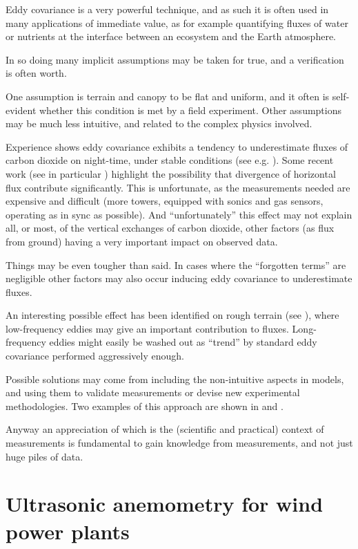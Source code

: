 \documentclass[a4paper,10pt]{book}
\begin{document}
Eddy covariance is a very powerful technique, and as such it is often used in many applications of immediate value, as for example quantifying fluxes of water or nutrients at the interface between an ecosystem and the Earth atmosphere.

In so doing many implicit assumptions may be taken for true, and a verification is often worth.

One assumption is terrain and canopy to be flat and uniform, and it often is self-evident whether this condition is met by a field experiment. Other assumptions may be much less intuitive, and related to the complex physics involved.

Experience shows eddy covariance exhibits a tendency to underestimate fluxes of carbon dioxide on night-time, under stable conditions (see e.g. \cite{Aubinet2012}). Some recent work (see in particular \cite{Aubinet2010}) highlight the possibility that divergence of horizontal flux contribute significantly. This is unfortunate, as the measurements needed are expensive and difficult (more towers, equipped with sonics and gas sensors, operating as in sync as possible). And ``unfortunately'' this effect may not explain all, or most, of the vertical exchanges of carbon dioxide, other factors (as flux from ground) having a very important impact on observed data.

Things may be even tougher than said. In cases where the ``forgotten terms'' are negligible other factors may also occur inducing eddy covariance to underestimate fluxes.

An interesting possible effect has been identified on rough terrain (see \cite{Sakai2001}), where low-frequency eddies may give an important contribution to fluxes. Long-frequency eddies might easily be washed out as ``trend'' by standard eddy covariance performed aggressively enough.

Possible solutions may come from including the non-intuitive aspects in models, and using them to validate measurements or devise new experimental methodologies. Two examples of this approach are shown in \cite{Canepa2010} and \cite{Montagnani2010}.

Anyway an appreciation of which is the (scientific and practical) context of measurements is fundamental to gain knowledge from measurements, and not just huge piles of data.


\section{Ultrasonic anemometry for wind power plants}
\end{document}
